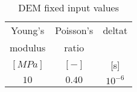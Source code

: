 \begin{table}[h]
\centering
\begin{tabular}{ccc}
\hline
    Young's & Poisson's & \acs{deltat}\\
   modulus & ratio & \\
    $[MPa]$ & $[-]$ & [s]\\
    \hline
    $10$    & $0.40$ & $10^{-6}$\\


\hline
\end{tabular}
\caption{DEM fixed input values}
\label{tab:09DEMFixedinputvalues}
\end{table}